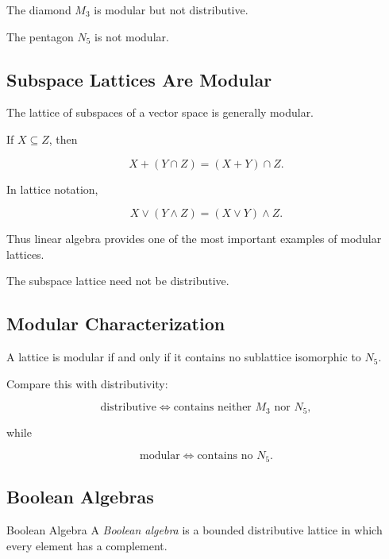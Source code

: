 The diamond \(M_3\) is modular but not distributive.

The pentagon \(N_5\) is not modular.

\subsection{Subspace Lattices Are Modular}
\label{subsec:subspace-modular}

The lattice of subspaces of a vector space is generally modular.

If \(X\subseteq Z\), then

\[ X+(Y\cap Z)=(X+Y)\cap Z. \]

In lattice notation,

\[ X\vee(Y\wedge Z)=(X\vee Y)\wedge Z. \]

Thus linear algebra provides one of the most important examples of modular
lattices.

The subspace lattice need not be distributive.

\subsection{Modular Characterization}
\label{subsec:modular-characterization}

\begin{theorem}
A lattice is modular if and only if it contains no sublattice isomorphic to
\(N_5\).
\end{theorem}

Compare this with distributivity:

\[ \text{distributive}
\iff\text{contains neither }M_3\text{ nor }N_5, \]

while

\[ \text{modular}
\iff\text{contains no }N_5. \]

\subsection{Boolean Algebras}
\label{subsec:lattice-boolean-algebras}

\begin{definitionbox}{Boolean Algebra}
A \emph{Boolean algebra} is a bounded distributive lattice in which every
element has a complement.
\end{definitionbox}

